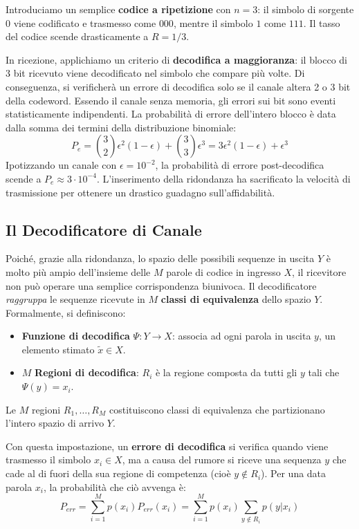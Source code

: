 Introduciamo un semplice \textbf{codice a ripetizione} con $n=3$: il simbolo di sorgente $0$ viene codificato e trasmesso come $000$, mentre il simbolo $1$ come $111$. Il tasso del codice scende drasticamente a $R = 1/3$.

In ricezione, applichiamo un criterio di \textbf{decodifica a maggioranza}: il blocco di 3 bit ricevuto viene decodificato nel simbolo che compare più volte. Di conseguenza, si verificherà un errore di decodifica solo se il canale altera 2 o 3 bit della codeword.
Essendo il canale senza memoria, gli errori sui bit sono eventi statisticamente indipendenti. La probabilità di errore dell'intero blocco è data dalla somma dei termini della distribuzione binomiale:
\[ P_e = \binom{3}{2}\epsilon^2(1-\epsilon) + \binom{3}{3}\epsilon^3 = 3\epsilon^2(1-\epsilon) + \epsilon^3 \]
Ipotizzando un canale con $\epsilon = 10^{-2}$, la probabilità di errore post-decodifica scende a $P_e \approx 3 \cdot 10^{-4}$. L'inserimento della ridondanza ha sacrificato la velocità di trasmissione per ottenere un drastico guadagno sull'affidabilità.



\subsection{Il Decodificatore di Canale}
Poiché, grazie alla ridondanza, lo spazio delle possibili sequenze in uscita $Y$ è molto più ampio dell'insieme delle $M$ parole di codice in ingresso $X$, il ricevitore non può operare una semplice corrispondenza biunivoca. Il decodificatore \textit{raggruppa} le sequenze ricevute in $M$ \textbf{classi di equivalenza} dello spazio $Y$.
\\
Formalmente, si definiscono:
\begin{itemize}
    \item \textbf{Funzione di decodifica} $\Psi: Y \rightarrow X$: associa ad ogni parola in uscita $y$, un elemento stimato $\tilde{x} \in X$.
    \item $M$ \textbf{Regioni di decodifica}: $R_i$ è la regione composta da tutti gli $y$ tali che $\Psi(y) = x_i$.
\end{itemize}
\noindent
Le $M$ regioni $R_1, \dots, R_M$ costituiscono classi di equivalenza che partizionano l'intero spazio di arrivo $Y$.



Con questa impostazione, un \textbf{errore di decodifica} si verifica quando viene trasmesso il simbolo $x_i \in X$, ma a causa del rumore si riceve una sequenza $y$ che cade al di fuori della sua regione di competenza (cioè $y \notin R_i$). 
Per una data parola $x_i$, la probabilità che ciò avvenga è:
\[P_{err}= \sum_{i=1}^M p(x_i)P_{err}(x_i)=\sum_{i=1}^M p(x_i) \sum_{y \notin R_i}p(y|x_i)\]


